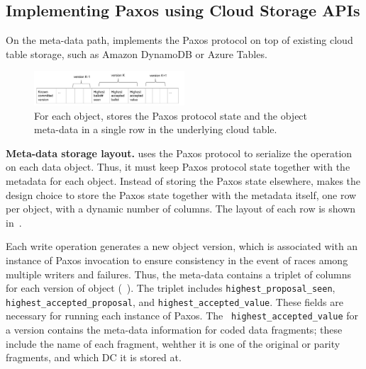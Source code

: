 
\subsection{Implementing Paxos using Cloud Storage APIs}

On the meta-data path, \name implements the Paxos protocol on top of existing cloud table storage, such 
as Amazon DynamoDB or Azure Tables.

\begin{figure}[tp]
\centering
\includegraphics[width=0.5\textwidth]{fig/Giza_Metadata}
\caption{For each object, \name stores the Paxos protocol state and the object meta-data 
in a single row in the underlying cloud table.\label{fig:metadata}}
\end{figure}

{\bf Meta-data storage layout.}
\name uses the Paxos protocol to serialize the operation on each data object.  Thus, it 
must keep Paxos protocol state together with the metadata for each object. Instead of storing the Paxos state elsewhere, {\name} makes the design
choice to store the Paxos state together with the metadata itself,
one row per object, with a dynamic number of columns. The layout of each row is
shown in~.  

Each \name write operation generates a new
object version, which is associated with an instance of Paxos invocation to
ensure consistency in the event of races among multiple writers and failures.
Thus, the meta-data contains a triplet of columns for each version of object
(~). The triplet includes {\tt highest\_proposal\_seen},
{\tt highest\_accepted\_proposal}, and {\tt highest\_accepted\_value}.  These
fields are necessary for running each instance of Paxos.  The {\tt
highest\_accepted\_value} for a version contains the meta-data information for
coded data fragments; these include the name of each fragment, wehther it is
one of the original or parity fragments, and which DC it is stored at. 


